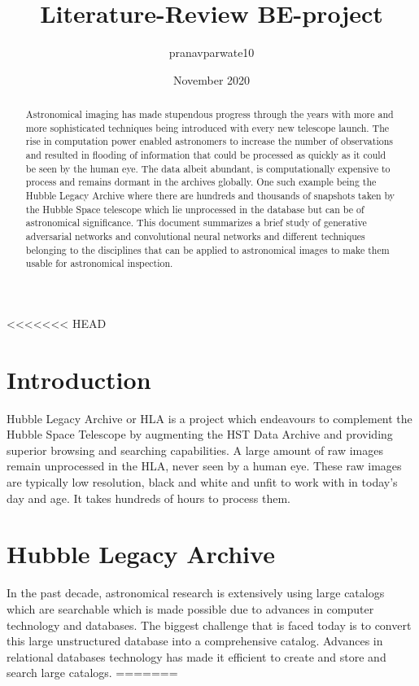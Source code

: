 \documentclass{article}
\title{Literature-Review BE-project}
\author{pranavparwate10 }
\date{November 2020}
\begin{document}
<<<<<<< HEAD

\maketitle

\section{Introduction}

Hubble Legacy Archive or HLA is a project which endeavours to complement the Hubble Space Telescope by augmenting the HST Data Archive and providing superior browsing and searching capabilities. A large amount of raw images remain unprocessed in the HLA, never seen by a human eye. These raw images are typically low resolution, black and white and unfit to work with in today's day and age. It takes hundreds of hours to process them.


\section{Hubble Legacy Archive}


In the past decade, astronomical research is extensively using large catalogs which are searchable which is made possible due to advances in computer technology and databases. The biggest challenge that is faced today is to convert this  large unstructured database into a comprehensive catalog. Advances in relational databases technology has made it efficient to create and store and search large catalogs. 
=======
	\maketitle
	
	\begin{abstract}
		Astronomical imaging has made stupendous progress through the years with more and more sophisticated techniques being introduced with every new telescope launch. The rise in computation power enabled astronomers to increase the number of observations and resulted in flooding of information that could be processed as quickly as it could be seen by the human eye. The data albeit abundant, is computationally expensive to process and remains dormant in the archives globally. One such example being the Hubble Legacy Archive where there are hundreds and thousands of snapshots taken by the Hubble Space telescope which lie unprocessed in the database but can be of astronomical significance. This document summarizes a brief study of generative adversarial networks and convolutional neural networks and different techniques belonging to the disciplines that can be applied to astronomical images to make them usable for astronomical inspection. 
	\end{abstract}
	
\end{document}
